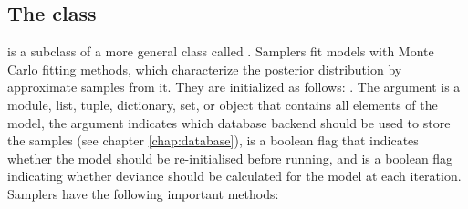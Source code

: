 \subsection[The Sampler class]{The  class} \label{sec:Sampler}
 is a subclass of a more general class called . Samplers fit models with Monte Carlo fitting methods, which characterize the posterior distribution by approximate samples from it. They are initialized as follows: . The  argument is a module, list, tuple, dictionary, set, or object that contains all elements of the model, the  argument indicates which database backend should be used to store the samples (see chapter \ref{chap:database}),  is a boolean flag that indicates whether the model should be re-initialised before running, and  is a boolean flag indicating whether deviance should be calculated for the model at each iteration. Samplers have the following important methods:
